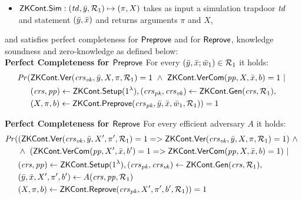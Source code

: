 \begin{definition}[ZK Continuations]
\begin{itemize}
\item ${\mathsf{ZKCont}}.{\mathsf{Sim}}: (\mathit{td}, \bar{y}, \mathcal{R}_1) \mapsto (\pi, X)$ takes as input a simulation trapdoor $\mathit{td}$ and statement $(\bar{y}, \bar{x})$ and returns 
arguments $\pi$ and $X$,
\end{itemize}
and satisfies perfect completeness for ${\mathsf{Preprove}}$ and for ${\mathsf{Reprove}}$,  knowledge soundness and zero-knowledge as defined below:\\
\noindent \textbf{Perfect Completeness for ${\mathsf{Preprove}}$} For every $(\bar{y}, \bar{x}; \bar{w}_1) \in \mathcal{R}_1$ it holds:
\begin{align*}
\mathit{Pr} (& {\mathsf{ZKCont}}.{\mathsf{Ver}}(\mathit{crs}_{\mathit{vk}}, \bar{y}, X, \pi, \mathcal{R}_1) = 1 \ \wedge \ {\mathsf{ZKCont}}.{\mathsf{VerCom}} (\mathit{pp}, X, \bar{x}, b) = 1\  | \ \\ 
                   & (\mathit{crs}, \mathit{pp}) \leftarrow {\ensuremath{\mathsf{ZKCont}}}.{\mathsf{Setup}} (1^{\lambda}), (\mathit{crs}_{\mathit{pk}}, \mathit{crs}_{\mathit{vk}}) \leftarrow {\ensuremath{\mathsf{ZKCont}}}.\mathsf{Gen}(\mathit{crs}, \mathcal{R}_1), \\ 
                   & (X, \pi, b) \leftarrow {\ensuremath{\mathsf{ZKCont}}}.{\mathsf{Preprove}}(\mathit{crs}_{\mathit{pk}}, \bar{y}, \bar{x}, \bar{w}_1, \mathcal{R}_1)) = 1
\end{align*}

\noindent \textbf{Perfect Completeness for ${\mathsf{Reprove}}$} For every efficient adversary $A$ it holds: 
\begin{align*}
\mathit{Pr} (& (\ZKCont.\Verify(\crsvk, \bar{y}, X', \pi', \relone) = 1  = >  \ZKCont.\Verify(\crsvk, \bar{y}, X, \pi, \relone) = 1)  \ \wedge \  \\
                   & \wedge \ (\ZKCont.\VerifyCom (\pp, X', \barx, b') = 1 => \ZKCont.\VerifyCom (\pp, X, \barx, b) = 1) \ | \\
                   & (\crs, \pp) \leftarrow \ZKCont.\Setup (1^{\lambda}), (\crspk, \crsvk) \leftarrow \ZKCont.\Gen(\crs, \relone), \\ 
                   & (\bary, \barx, X', \pi', b') \leftarrow A(\crs,\pp, \relone) \\
                   & (X, \pi, b) \leftarrow \ZKCont.\Reprove(\crspk, X', \pi', b', \relone)) = 1
\end{align*}


\end{definition}
